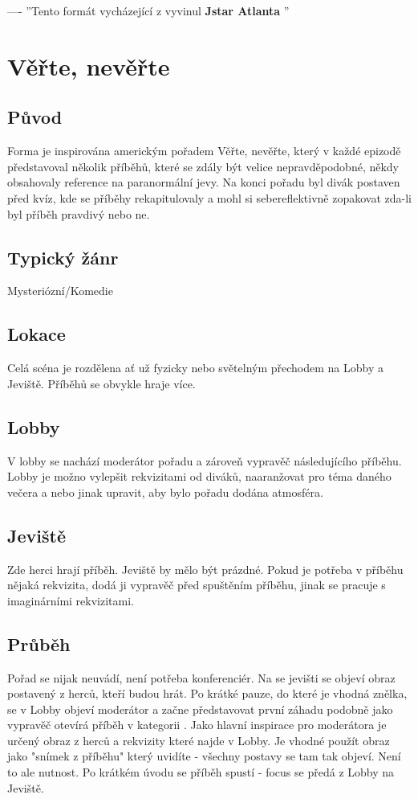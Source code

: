 \documentclass[main.tex]{subfiles}
\begin{document}
 
---- 
''Tento formát vycházející z  vyvinul \textbf{ Jstar Atlanta }'' 
 
\needspace{5cm} \section{Věřte, nevěřte} \label{věřte, nevěřte}  
 
\subsection{ Původ }  
Forma je inspirována americkým pořadem Věřte, nevěřte, který v každé epizodě představoval několik příběhů, které se zdály být velice nepravděpodobné, někdy obsahovaly reference na paranormální jevy. Na konci pořadu byl divák postaven před kvíz, kde se příběhy rekapitulovaly a mohl si sebereflektivně zopakovat zda-li byl příběh pravdivý nebo ne. 
 
\subsection{ Typický žánr }  
Mysteriózní/Komedie 
 
\subsection{ Lokace }  
Celá scéna je rozdělena ať už fyzicky nebo světelným přechodem na Lobby a Jeviště. Příběhů se obvykle hraje více. 
 
\subsection{ Lobby }  
V lobby se nachází moderátor pořadu a zároveň vypravěč následujícího příběhu. Lobby je možno vylepšit rekvizitami od diváků, naaranžovat pro téma daného večera a nebo jinak upravit, aby bylo pořadu dodána atmosféra. 
 
\subsection{ Jeviště}  
Zde herci hrají příběh. Jeviště by mělo být prázdné. Pokud je potřeba v příběhu nějaká rekvizita, dodá ji vypravěč před spuštěním příběhu, jinak se pracuje s imaginárními rekvizitami. 
 
\subsection{ Průběh }  
Pořad se nijak neuvádí, není potřeba konferenciér. Na se jevišti se objeví obraz postavený z herců, kteří budou hrát. Po krátké pauze, do které je vhodná znělka, se v Lobby objeví moderátor a začne představovat první záhadu podobně jako vypravěč otevírá příběh v kategorii . Jako hlavní inspirace pro moderátora je určený obraz z herců a rekvizity které najde v Lobby. Je vhodné použít obraz jako "snímek z příběhu"{} který uvidíte - všechny postavy se tam tak objeví. Není to ale nutnost. Po krátkém úvodu se příběh spustí - focus se předá z Lobby na Jeviště.  
 
\end{document}

